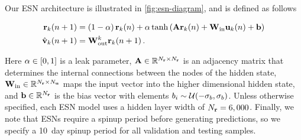 Our ESN architecture is illustrated in \cref{fig:esn-diagram}, and is defined as
follows
\begin{linenomath*}\begin{equation}
    \begin{aligned}
        \mathbf{r}_{k}(n+1)
        &=
        \left(1-\alpha\right)\mathbf{r}_{k}(n)
        +
        \alpha \tanh\left(
            \mathbf{A} \mathbf{r}_{k}(n) + \mathbf{W}_\text{in} \mathbf{u}_{k}(n) + \mathbf{b}
            \right)
             \\
        \hat{\mathbf{v}}_{k}(n+1)
        &= \mathbf{W}_\text{out}^{k} \mathbf{r}_{k}(n+1) \, .
    \end{aligned}
    \label{eq:rc}
\end{equation}\end{linenomath*}
Here
$\alpha\in[0,1]$ is a leak parameter,
$\mathbf{A} \in \mathbb{R}^{N_{\mathbf{r}}\times N_{\mathbf{r}}}$ is an adjacency matrix that
determines the internal connections between the nodes of the hidden state,
$\mathbf{W}_\text{in} \in \mathbb{R}^{N_{\mathbf{r}}\times N_{\mathbf{u}}}$ maps the input vector
into the higher dimensional hidden state,
and $\mathbf{b}\in\mathbb{R}^{N_{\mathbf{r}}}$
is the bias vector with elements
$b_i \sim \mathcal{U}(-\sigma_{b},\sigma_{b})$.
Unless otherwise specified, each ESN model uses a hidden layer width of
$N_{\mathbf{r}}=6,000$.
Finally, we note that ESNs require a spinup period before generating
predictions, so we specify a 10~day spinup period for all validation and testing
samples.

